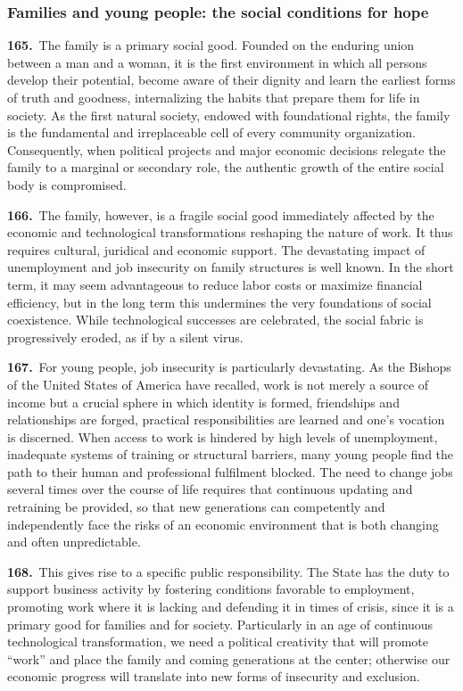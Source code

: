\documentclass{article}
\begin{document}
\subsubsection{Families and young people: the social conditions for hope}

\textbf{165.}\ The family is a primary social good. Founded on the enduring union between a man and a woman, it is the first environment in which all persons develop their potential, become aware of their dignity and learn the earliest forms of truth and goodness, internalizing the habits that prepare them for life in society.\cite{n166} As the first natural society, endowed with foundational rights, the family is the fundamental and irreplaceable cell of every community organization.\cite{n167} Consequently, when political projects and major economic decisions relegate the family to a marginal or secondary role, the authentic growth of the entire social body is compromised.\cite{n168}

\textbf{166.}\ The family, however, is a fragile social good immediately affected by the economic and technological transformations reshaping the nature of work. It thus requires cultural, juridical and economic support. The devastating impact of unemployment and job insecurity on family structures is well known. In the short term, it may seem advantageous to reduce labor costs or maximize financial efficiency, but in the long term this undermines the very foundations of social coexistence. While technological successes are celebrated, the social fabric is progressively eroded, as if by a silent virus.

\textbf{167.}\ For young people, job insecurity is particularly devastating. As the Bishops of the United States of America have recalled, work is not merely a source of income but a crucial sphere in which identity is formed, friendships and relationships are forged, practical responsibilities are learned and one's vocation is discerned.\cite{n169} When access to work is hindered by high levels of unemployment, inadequate systems of training or structural barriers, many young people find the path to their human and professional fulfilment blocked. The need to change jobs several times over the course of life requires that continuous updating and retraining be provided, so that new generations can competently and independently face the risks of an economic environment that is both changing and often unpredictable.\cite{n170}

\textbf{168.}\ This gives rise to a specific public responsibility. The State has the duty to support business activity by fostering conditions favorable to employment, promoting work where it is lacking and defending it in times of crisis, since it is a primary good for families and for society.\cite{n171} Particularly in an age of continuous technological transformation, we need a political creativity that will promote ``work'' and place the family and coming generations at the center; otherwise our economic progress will translate into new forms of insecurity and exclusion.
\end{document}
